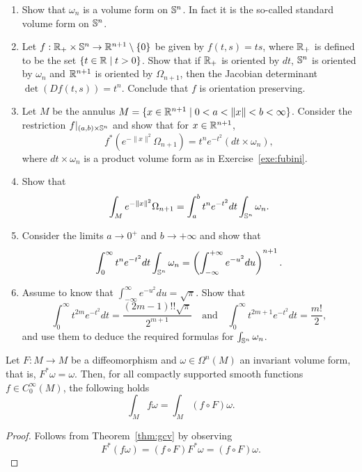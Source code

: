 \begin{exercise}
	\begin{enumerate}
		\item Show that $\omega_n$ is a volume form on $\mathbb{S}^n$. In fact it is the so-called standard volume form on $\mathbb{S}^n$.
		\item Let $f:\mathbb{R}_+\times\mathbb{S}^n\to \mathbb{R}^{n+1}\setminus\{0\}$ be given by $f(t,s) = ts$, where $\mathbb{R}_+$ is defined to be the set $\{t\in\mathbb{R} \mid t >0\}$.
		      Show that if $\mathbb{R}_+$ is oriented by $dt$, $\mathbb{S}^n$ is oriented by $\omega_n$ and $\mathbb{R}^{n+1}$ is oriented by $\Omega_{n+1}$, then the Jacobian determinant $\det(Df(t,s))= t^n$.
		      Conclude that $f$ is orientation preserving.
		\item Let $M$ be the annulus $M = \{x\in\mathbb{R}^{n+1} \mid 0<a<\|x\|<b<\infty\}$. Consider the restriction $f|_{(a,b)\times \mathbb{S}^n}$ and show that for $x\in\mathbb{R}^{n+1}$,
		      \begin{equation}
			      f^*\left(e^{-\|x\|^2}\Omega_{n+1}\right) = t^n e^{-t^2}(dt \times \omega_n),
		      \end{equation}
		      where $dt\times\omega_n$ is a product volume form as in Exercise~\ref{exe:fubini}.
		\item Show that
		      \begin{equation}
			      \int_{M}e^{-\|x\|^2}\Omega_{n+1} = \int_a^b t^ne^{-t^2} dt \int_{\mathbb{S}^n}\omega_n.
		      \end{equation}
		\item Consider the limits $a\to0^+$ and $b\to+\infty$ and show that
		      \begin{equation}
			      \int_0^\infty t^n e^{-t^2} dt \int_{\mathbb{S}^n}\omega_n = \left(\int_{-\infty}^{+\infty} e^{-u^2} du\right)^{n+1}.
		      \end{equation}
		\item Assume to know that $\int_{-\infty}^{\infty} e^{-u^2}du = \sqrt{\pi}$. Show that
		      \begin{equation}
			      \int_0^\infty t^{2m} e^{-t^2}dt = \frac{(2m-1)!!\sqrt{\pi}}{2^{m+1}}
			      \quad\mbox{and}\quad
			      \int_0^\infty t^{2m+1} e^{-t^2}dt = \frac{m!}{2},
		      \end{equation}
		      and use them to deduce the required formulas for $\int_{\mathbb{S}^n}\omega_n$.
	\end{enumerate}
\end{exercise}

\begin{corollary}
	Let $F:M\to M$ be a diffeomorphism and $\omega\in\Omega^n(M)$ an invariant volume form, that is, $F^*\omega =\omega$.
	Then, for all compactly supported smooth functions $f\in C^\infty_0(M)$, the following holds
	\begin{equation}
		\int_M f\omega = \int_M (f\circ F)\omega.
	\end{equation}
\end{corollary}
\begin{proof}
	Follows from Theorem~\ref{thm:gcv} by observing
	\begin{equation}
		F^*(f\omega) = (f\circ F) F^*\omega = (f\circ F)\omega.
	\end{equation}
\end{proof}

